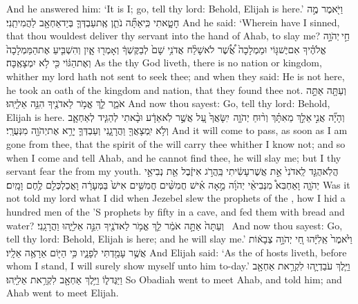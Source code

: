 {And he answered him: ‘It is I; go, tell thy lord: Behold, Elijah is here.’}
{וַיֹּ֖אמֶר מֶ֣ה חָטָ֑אתִי כִּֽי\maqqaf אַתָּ֞ה נֹתֵ֧ן אֶֽת\maqqaf עַבְדְּךָ֛ בְּיַד\maqqaf אַחְאָ֖ב לַהֲמִיתֵֽנִי׃}
{And he said: ‘Wherein have I sinned, that thou wouldest deliver thy servant into the hand of Ahab, to slay me?}
{חַ֣י \legarmeh  יְהֹוָ֣ה אֱלֹהֶ֗יךָ אִם\maqqaf יֶשׁ\maqqaf גּ֤וֹי וּמַמְלָכָה֙ אֲ֠שֶׁ֠ר לֹא\maqqaf שָׁלַ֨ח אֲדֹנִ֥י שָׁם֙ לְבַקֶּשְׁךָ֔ וְאָמְר֖וּ אָ֑יִן וְהִשְׁבִּ֤יעַ אֶת\maqqaf הַמַּמְלָכָה֙ וְאֶת\maqqaf הַגּ֔וֹי כִּ֖י לֹ֥א יִמְצָאֶֽכָּה׃}
{As the \lord\space thy God liveth, there is no nation or kingdom, whither my lord hath not sent to seek thee; and when they said: He is not here, he took an oath of the kingdom and nation, that they found thee not.}
{וְעַתָּ֖ה אַתָּ֣ה אֹמֵ֑ר לֵ֛ךְ אֱמֹ֥ר לַאדֹנֶ֖יךָ הִנֵּ֥ה אֵלִיָּֽהוּ׃}
{And now thou sayest: Go, tell thy lord: Behold, Elijah is here.}
{וְהָיָ֞ה אֲנִ֣י \legarmeh  אֵלֵ֣ךְ מֵאִתָּ֗ךְ וְר֨וּחַ יְהֹוָ֤ה \pasek  יִֽשָּׂאֲךָ֙ עַ֚ל אֲשֶׁ֣ר לֹֽא\maqqaf אֵדָ֔ע וּבָ֨אתִי לְהַגִּ֧יד לְאַחְאָ֛ב וְלֹ֥א יִֽמְצָאֲךָ֖ וַהֲרָגָ֑נִי וְעַבְדְּךָ֛ יָרֵ֥א אֶת\maqqaf יְהֹוָ֖ה מִנְּעֻרָֽי׃}
{And it will come to pass, as soon as I am gone from thee, that the spirit of the \lord\space will carry thee whither I know not; and so when I come and tell Ahab, and he cannot find thee, he will slay me; but I thy servant fear the \lord\space from my youth.}
{הֲלֹֽא\maqqaf הֻגַּ֤ד לַֽאדֹנִי֙ אֵ֣ת אֲשֶׁר\maqqaf עָשִׂ֔יתִי בַּֽהֲרֹ֣ג אִיזֶ֔בֶל אֵ֖ת נְבִיאֵ֣י יְהֹוָ֑ה וָאַחְבִּא֩ מִנְּבִיאֵ֨י יְהֹוָ֜ה מֵ֣אָה אִ֗ישׁ חֲמִשִּׁ֨ים חֲמִשִּׁ֥ים אִישׁ֙ בַּמְּעָרָ֔ה וָאֲכַלְכְּלֵ֖ם לֶ֥חֶם וָמָֽיִם׃}
{Was it not told my lord what I did when Jezebel slew the prophets of the \lord, how I hid a hundred men of the \lord’S prophets by fifty in a cave, and fed them with bread and water?}
{וְעַתָּה֙ אַתָּ֣ה אֹמֵ֔ר לֵ֛ךְ אֱמֹ֥ר לַאדֹנֶ֖יךָ הִנֵּ֣ה אֵלִיָּ֑הוּ וַהֲרָגָֽנִי׃ \setuma }
{And now thou sayest: Go, tell thy lord: Behold, Elijah is here; and he will slay me.’}
{וַיֹּ֙אמֶר֙ אֵֽלִיָּ֔הוּ חַ֚י יְהֹוָ֣ה צְבָא֔וֹת אֲשֶׁ֥ר עָמַ֖דְתִּי לְפָנָ֑יו כִּ֥י הַיּ֖וֹם אֵרָאֶ֥ה אֵלָֽיו׃}
{And Elijah said: ‘As the \lord\space of hosts liveth, before whom I stand, I will surely show myself unto him to-day.’}
{וַיֵּ֧לֶךְ עֹבַדְיָ֛הוּ לִקְרַ֥את אַחְאָ֖ב וַיַּגֶּד\maqqaf ל֑וֹ וַיֵּ֥לֶךְ אַחְאָ֖ב לִקְרַ֥את אֵלִיָּֽהוּ׃}
{So Obadiah went to meet Ahab, and told him; and Ahab went to meet Elijah.}
